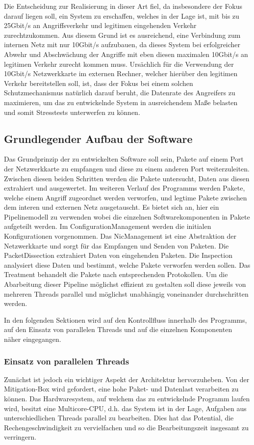 \documentclass[../review_2.tex]{subfiles}
\begin{document}
Die Entscheidung zur Realisierung in dieser Art fiel, da insbesondere der Fokus darauf liegen soll, ein System zu erschaffen, welches in der Lage ist, mit bis zu 25Gbit/s an Angriffsverkehr und legitimen eingehenden Verkehr zurechtzukommen. Aus diesem Grund ist es ausreichend, eine Verbindung zum internen Netz mit nur 10Gbit/s aufzubauen, da dieses System bei erfolgreicher Abwehr und Abschwächung der Angriffe mit eben diesen maximalen 10Gbit/s an legitimen Verkehr zurecht kommen muss. Ursächlich für die Verwendung der 10Gbit/s Netzwerkkarte im externen Rechner, welcher hierüber den legitimen Verkehr bereitstellen soll, ist, dass der Fokus bei einem solchen Schutzmechanismus natürlich darauf beruht, die Datenrate des Angreifers zu maximieren, um das zu entwickelnde System in ausreichendem Maße belasten und somit Stresstests unterwerfen zu können.


\subsection{Grundlegender Aufbau der Software} \label{section:basic_structure}
Das Grundprinzip der zu entwickelten Software soll sein, Pakete auf einem Port der Netzwerkkarte zu empfangen und diese zu einem anderen Port weiterzuleiten. Zwischen diesen beiden Schritten werden die Pakete untersucht, Daten aus diesen extrahiert und ausgewertet. Im weiteren Verlauf des Programms werden Pakete, welche einem Angriff zugeordnet werden verworfen, und legtime Pakete zwischen dem interen und externen Netz ausgetauscht. Es bietet sich an, hier ein Pipelinemodell zu verwenden wobei die einzelnen Softwarekomponenten in Pakete aufgeteilt werden. Im ConfigurationManagement werden die initialen Konfigurationen vorgenommen. Das NicManagement ist eine Abstraktion der Netzwerkkarte und sorgt für das Empfangen und Senden von Paketen. Die PacketDissection extrahiert Daten von eingehenden Paketen. Die Inspection analysiert diese Daten und bestimmt, welche Pakete verworfen werden sollen. Das Treatment behandelt die Pakete nach entsprechenden Protokollen. Um die Abarbeitung dieser Pipeline möglichst effizient zu gestalten soll diese jeweils von mehreren Threads parallel und möglichst unabhängig voneinander durchschritten werden.

In den folgenden Sektionen wird auf den Kontrollfluss innerhalb des Programms, auf den Einsatz von parallelen Threads und auf die einzelnen Komponenten näher eingegangen.

\subsubsection{Einsatz von parallelen Threads}
Zunächst ist jedoch ein wichtiger Aspekt der Architektur hervorzuheben. Von der Mitigation-Box wird gefordert, eine hohe Paket- und Datenlast verarbeiten zu können. Das Hardwaresystem, auf welchem das zu entwickelnde Programm laufen wird, besitzt eine Multicore-CPU, d.h. das System ist in der Lage, Aufgaben aus unterschiedlichen Threads parallel zu bearbeiten. Dies hat das Potential, die Rechengeschwindigkeit zu vervielfachen und so die Bearbeitungszeit insgesamt zu verringern.
\end{document}
